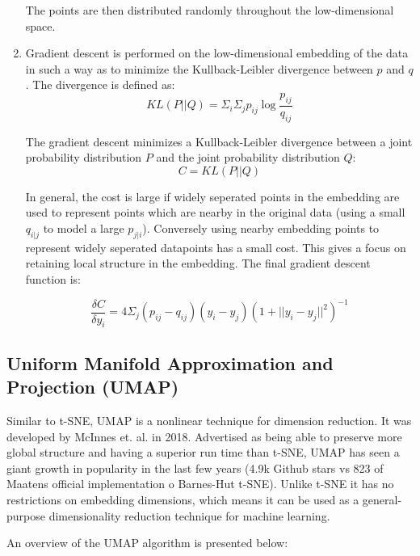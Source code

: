 \documentclass[a4paper, 12pt, twoside]{report}
\begin{document}
\begin{enumerate}
    The points are then distributed randomly throughout the low-dimensional space.

    \item Gradient descent is performed on the low-dimensional embedding of the data in such a way as to minimize the Kullback-Leibler divergence between $p$ and $q$. The divergence is defined as:
    \[ KL(P || Q) = \Sigma_{i}\Sigma_{j}p_{ij}\log \frac{p_{ij}}{q_{ij}} \]

    The gradient descent minimizes a Kullback-Leibler divergence between a joint probability distribution $P$ and the joint probability distribution $Q$:
    \[ C = KL(P||Q)\]

    In general, the cost is large if widely seperated points in the embedding are used to represent points which are nearby in the original data (using a small $q_{i|j}$ to model a large $p_{j|i}$). Conversely using nearby embedding points to represent widely seperated datapoints has a small cost. This gives a focus on retaining local structure in the embedding. The final gradient descent function is:

    \[ \frac{\delta C}{\delta y_{i}} = 4 \Sigma_{j}(p_{ij} - q_{ij})(y_{i} - y_{j})(1 + ||y_{i} - y_{j}||^{2})^{-1} \]

\end{enumerate}

\pagebreak

\subsection{Uniform Manifold Approximation and Projection (UMAP)}
\label{sec:org6a758a8}
Similar to t-SNE, UMAP is a nonlinear technique for dimension reduction. It was developed by McInnes et. al. in 2018. Advertised as being able to preserve more global structure and having a superior run time than t-SNE, UMAP has seen a giant growth in popularity in the last few years (4.9k Github stars vs 823 of Maatens official implementation o Barnes-Hut t-SNE). Unlike t-SNE it has no restrictions on embedding dimensions, which means it can be used as a general-purpose dimensionality reduction technique for machine learning.

An overview of the UMAP algorithm is presented below:
\end{document}
